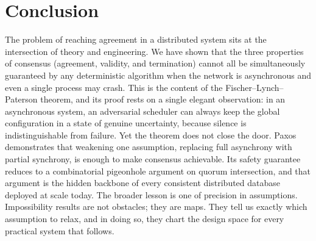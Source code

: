 \section{Conclusion}\label{sec:conclusion}

The problem of reaching agreement in a distributed system sits at the intersection of theory and engineering. We have shown that the three properties of consensus (agreement, validity, and termination) cannot all be simultaneously guaranteed by any deterministic algorithm when the network is asynchronous and even a single process may crash. This is the content of the Fischer--Lynch--Paterson theorem, and its proof rests on a single elegant observation: in an asynchronous system, an adversarial scheduler can always keep the global configuration in a state of genuine uncertainty, because silence is indistinguishable from failure.
Yet the theorem does not close the door. Paxos demonstrates that weakening one assumption, replacing full asynchrony with partial synchrony, is enough to make consensus achievable. Its safety guarantee reduces to a combinatorial pigeonhole argument on quorum intersection, and that argument is the hidden backbone of every consistent distributed database deployed at scale today.
The broader lesson is one of precision in assumptions. Impossibility results are not obstacles; they are maps. They tell us exactly which assumption to relax, and in doing so, they chart the design space for every practical system that follows.

